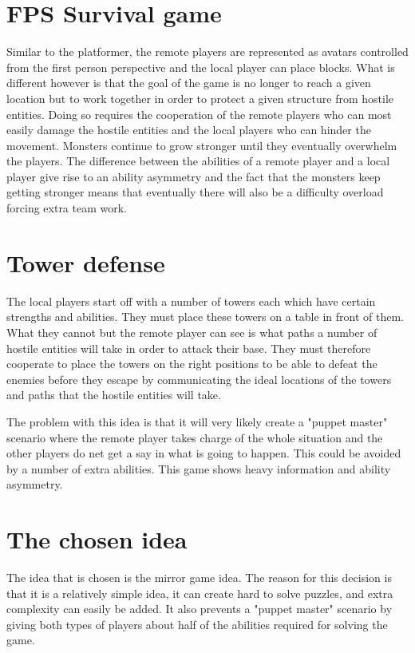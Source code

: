 \section{FPS Survival game}
Similar to the platformer, the remote players are represented
 as avatars controlled from the first person perspective and 
 the local player can place blocks. What is different however 
 is that the goal of the game is no longer to reach a given 
 location but to work together in order to protect a given 
 structure from hostile entities. Doing so requires the 
 cooperation of the remote players who can most easily damage 
 the hostile entities and the local players who can hinder the
 movement. Monsters continue to grow stronger until they eventually 
 overwhelm the players. 
The difference between the abilities of a remote player and
a local player give rise to an ability asymmetry and the fact 
that the monsters keep getting stronger means that eventually 
there will also be a difficulty overload forcing extra 
team work. 

\section{Tower defense }
The local players start off with a number of towers each 
which have certain strengths and abilities. They must place
 these towers on a table in front of them. What they cannot
 but the remote player can see is what paths a number of
 hostile entities will take in order to attack their base.
They must therefore cooperate to place the towers on the right 
 positions to be able to defeat the enemies before they escape
 by communicating the ideal locations of the 
 towers and paths that the hostile entities will take. 
 
 The problem with this idea is that it will very likely create a 
 "puppet master" scenario where the remote player takes charge
 of the whole situation and the other players do net get a 
 say in what is going to happen. This could be avoided by a 
 number of extra abilities. This game shows heavy 
 information and ability asymmetry. 
 
 \section{The chosen idea}
 The idea that is chosen is the mirror game idea. The reason for this
 decision is that it is a relatively simple idea, it can create hard
 to solve puzzles, and extra complexity can easily be added. It also
 prevents a "puppet master" scenario by giving both types of players
 about half of the abilities required for solving the game.